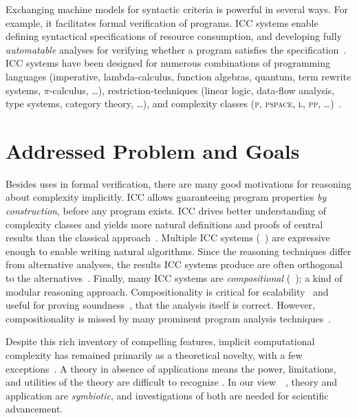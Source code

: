 Exchanging machine models for syntactic criteria is powerful in several ways.
For example, it facilitates formal verification of programs.
ICC systems enable defining syntactical specifications of resource consumption, and developing fully \emph{automatable} analyses for verifying whether a program satisfies the specification~\cite{heraud2011}.
ICC systems have been designed for numerous combinations of programming languages (imperative,  lambda-calculus, function algebras, quantum, term rewrite systems, \(\pi\)-calculus, \ldots), restriction-techniques (linear logic, data-flow analysis, type systems, category theory, \ldots), and complexity classes (\textsc{p}, \textsc{pspace}, \textsc{l}, \textsc{pp}, \ldots)~\cite{moyen2017,pchoux2020}.

\section{Addressed Problem and Goals}
\label{sec:aicc-goals}

Besides uses in formal verification, there are many good motivations for reasoning about complexity implicitly.
ICC allows guaranteeing program properties \emph{by construction}, before any program exists.
ICC drives better understanding of complexity classes and yields more natural definitions and proofs of central results than the classical approach~\cite{kristiansen2017}.
Multiple ICC systems (\eg~\cite{jones2009,marion2011}) are expressive enough to enable writing {natural} algorithms.
Since the reasoning techniques differ from alternative analyses, the results ICC systems produce are often orthogonal to the alternatives~\cite{aubert20222}.
Finally, many ICC systems are \emph{compositional} (\eg~\cite{jones2009,marion2011,hainry2023}); a kind of modular reasoning approach.
Compositionality is critical for scalability~\cite{carbonneaux2015} and useful for proving soundness~\cite{keidel2021}, \ie that the analysis itself is correct.
However, compositionality is missed by many prominent program analysis techniques~\cite{carbonneaux2015}.

Despite this rich inventory of compelling features, implicit computational complexity has remained primarily as a theoretical novelty, with a few exceptions~\cite{avanzini2017,avanzini2008,moyen20172,hainry2021}.
A theory in absence of applications means the power, limitations, and utilities of the theory are difficult to recognize%
.
In our view~\cite[pg. xxxv]{bishop2003}~\cite[p. 75]{moyen2017}, theory and application are \emph{symbiotic}, and investigations of both are needed for scientific advancement.

